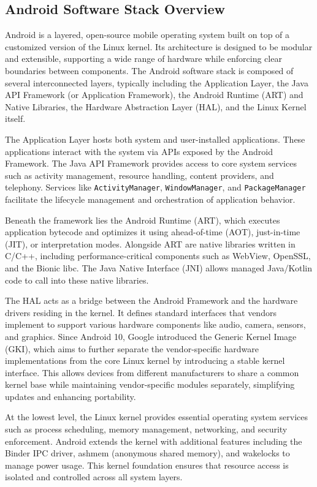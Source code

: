 \documentclass[a4paper,12pt]{report}
\begin{document}
\subsection{Android Software Stack Overview}
Android is a layered, open-source mobile operating system built on top of a customized version of the Linux kernel. Its architecture is designed to be modular and extensible, supporting a wide range of hardware while enforcing clear boundaries between components. The Android software stack is composed of several interconnected layers, typically including the Application Layer, the Java API Framework (or Application Framework), the Android Runtime (ART) and Native Libraries, the Hardware Abstraction Layer (HAL), and the Linux Kernel itself.


The Application Layer hosts both system and user-installed applications.
These applications interact with the system via APIs exposed by the Android Framework.
The Java API Framework provides access to core system services such as activity management,
resource handling, content providers, and telephony. Services like \texttt{ActivityManager},
\texttt{WindowManager}, and \texttt{PackageManager} facilitate the lifecycle management and
orchestration of application behavior.

Beneath the framework lies the Android Runtime (ART), which executes application bytecode and optimizes it using ahead-of-time (AOT), just-in-time (JIT), or interpretation modes. Alongside ART are native libraries written in C/C++, including performance-critical components such as WebView, OpenSSL, and the Bionic libc. The Java Native Interface (JNI) allows managed Java/Kotlin code to call into these native libraries.

The HAL acts as a bridge between the Android Framework and the hardware drivers residing in the kernel. It defines standard interfaces that vendors implement to support various hardware components like audio, camera, sensors, and graphics. Since Android 10, Google introduced the Generic Kernel Image (GKI), which aims to further separate the vendor-specific hardware implementations from the core Linux kernel by introducing a stable kernel interface. This allows devices from different manufacturers to share a common kernel base while maintaining vendor-specific modules separately, simplifying updates and enhancing portability.

At the lowest level, the Linux kernel provides essential operating system services such as process scheduling, memory management, networking, and security enforcement. Android extends the kernel with additional features including the Binder IPC driver, ashmem (anonymous shared memory), and wakelocks to manage power usage. This kernel foundation ensures that resource access is isolated and controlled across all system layers.
\end{document}

